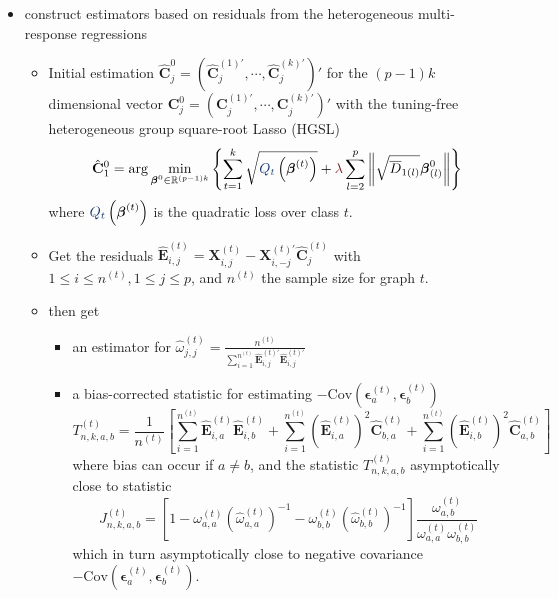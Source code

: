 \documentclass[twoside]{article}
\begin{document}
\begin{itemize}
    \item construct estimators based on residuals from the heterogeneous multi-response regressions
    \begin{itemize}
        \item Initial estimation $\hat{\mathbf{C}}_j^0 = \left( {\hat{\mathbf{C}}_j^{(1)'}},\cdots,{\hat{\mathbf{C}}_j^{(k)'}} \right)'$ for the $(p-1)k$ dimensional vector ${\mathbf{C}}_j^0 = \left( {{\mathbf{C}}_j^{(1)'}},\cdots,{{\mathbf{C}}_j^{(k)'}} \right)'$ with the tuning-free heterogeneous group square-root Lasso (HGSL) 
        $$ \hat{\mathbf{C}}^0_1 = \arg\min_{\boldsymbol{\beta}^0 \in \mathbb{R}^{(p-1)k}}\left\{ \sum^k_{t=1}\sqrt{\textcolor{myblue}{Q_t}\left(\boldsymbol{\beta}^{(t)}\right)} + \textcolor{myred}{\lambda}\sum^p_{l=2}\left\Vert \sqrt{\bar{D}_{1(l)}}\boldsymbol{\beta}^0_{(l)} \right\Vert  \right\} $$ where $\textcolor{myblue}{Q_t}\left(\boldsymbol{\beta}^{(t)}\right)$ is the quadratic loss over class $t$.
        \item Get the residuals $\hat{\mathbf{E}}^{(t)}_{i,j} = \mathbf{X}^{(t)}_{i,j} - \mathbf{X}^{(t)'}_{i,-j}\hat{\mathbf{C}}_{j}^{(t)}$ with $1\leq i\leq n^{(t)},1\leq j\leq p$, and $n^{(t)}$ the sample size for graph $t$.
        \item then get 
        \begin{itemize}
            \item an estimator for $\hat{\omega}_{j,j}^{(t)} = \frac{n^{(t)}}{\sum^{n^{(t)}}_{i=1}\hat{\mathbf{E}}_{i,j}^{(t)'}\hat{\mathbf{E}}_{i,j}^{(t)'}}$
            \item a bias-corrected statistic for estimating $-\mathrm{Cov}\left(\boldsymbol{\epsilon}^{(t)}_a,\boldsymbol{\epsilon}^{(t)}_b\right)$ $$ T^{(t)}_{n,k,a,b} = \frac{1}{n^{(t)}}\left[ \sum^{n^{(t)}}_{i=1} \hat{\mathbf{E}}_{i,a}^{(t)} \hat{\mathbf{E}}_{i,b}^{(t)} + \sum^{n^{(t)}}_{i=1} \left(\hat{\mathbf{E}}_{i,a}^{(t)}\right)^2 \hat{\mathbf{C}}_{b,a}^{(t)} + \sum^{n^{(t)}}_{i=1}\left(\hat{\mathbf{E}}_{i,b}^{(t)}\right)^2 \hat{\mathbf{C}}_{a,b}^{(t)} \right] $$ where bias can occur if $a\neq b$, and the statistic $T^{(t)}_{n,k,a,b}$ asymptotically close to statistic $$ J^{(t)}_{n,k,a,b} = \left[ 1-\omega_{a,a}^{(t)}\left(\hat{\omega}_{a,a}^{(t)}\right)^{-1} - \omega_{b,b}^{(t)}\left( \hat{\omega}_{b,b}^{(t)} \right)^{-1} \right] \frac{\omega_{a,b}^{(t)}}{\omega_{a,a}^{(t)}\omega_{b,b}^{(t)}} $$ which in turn asymptotically close to negative covariance $-\mathrm{Cov}\left(\boldsymbol{\epsilon}^{(t)}_a,\boldsymbol{\epsilon}^{(t)}_b\right)$.

\end{itemize}
\end{itemize}
\end{itemize}
\end{document}
